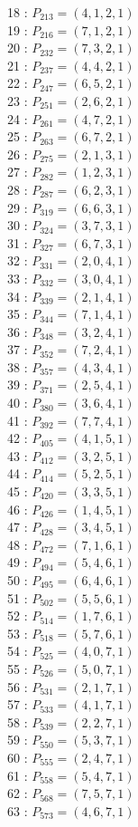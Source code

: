 \documentclass{article}
\begin{document}
{\begin{multicols}{2}
18 : $P_{213}=( 4, 1, 2, 1 )$\\
19 : $P_{216}=( 7, 1, 2, 1 )$\\
20 : $P_{232}=( 7, 3, 2, 1 )$\\
21 : $P_{237}=( 4, 4, 2, 1 )$\\
22 : $P_{247}=( 6, 5, 2, 1 )$\\
23 : $P_{251}=( 2, 6, 2, 1 )$\\
24 : $P_{261}=( 4, 7, 2, 1 )$\\
25 : $P_{263}=( 6, 7, 2, 1 )$\\
26 : $P_{275}=( 2, 1, 3, 1 )$\\
27 : $P_{282}=( 1, 2, 3, 1 )$\\
28 : $P_{287}=( 6, 2, 3, 1 )$\\
29 : $P_{319}=( 6, 6, 3, 1 )$\\
30 : $P_{324}=( 3, 7, 3, 1 )$\\
31 : $P_{327}=( 6, 7, 3, 1 )$\\
32 : $P_{331}=( 2, 0, 4, 1 )$\\
33 : $P_{332}=( 3, 0, 4, 1 )$\\
34 : $P_{339}=( 2, 1, 4, 1 )$\\
35 : $P_{344}=( 7, 1, 4, 1 )$\\
36 : $P_{348}=( 3, 2, 4, 1 )$\\
37 : $P_{352}=( 7, 2, 4, 1 )$\\
38 : $P_{357}=( 4, 3, 4, 1 )$\\
39 : $P_{371}=( 2, 5, 4, 1 )$\\
40 : $P_{380}=( 3, 6, 4, 1 )$\\
41 : $P_{392}=( 7, 7, 4, 1 )$\\
42 : $P_{405}=( 4, 1, 5, 1 )$\\
43 : $P_{412}=( 3, 2, 5, 1 )$\\
44 : $P_{414}=( 5, 2, 5, 1 )$\\
45 : $P_{420}=( 3, 3, 5, 1 )$\\
46 : $P_{426}=( 1, 4, 5, 1 )$\\
47 : $P_{428}=( 3, 4, 5, 1 )$\\
48 : $P_{472}=( 7, 1, 6, 1 )$\\
49 : $P_{494}=( 5, 4, 6, 1 )$\\
50 : $P_{495}=( 6, 4, 6, 1 )$\\
51 : $P_{502}=( 5, 5, 6, 1 )$\\
52 : $P_{514}=( 1, 7, 6, 1 )$\\
53 : $P_{518}=( 5, 7, 6, 1 )$\\
54 : $P_{525}=( 4, 0, 7, 1 )$\\
55 : $P_{526}=( 5, 0, 7, 1 )$\\
56 : $P_{531}=( 2, 1, 7, 1 )$\\
57 : $P_{533}=( 4, 1, 7, 1 )$\\
58 : $P_{539}=( 2, 2, 7, 1 )$\\
59 : $P_{550}=( 5, 3, 7, 1 )$\\
60 : $P_{555}=( 2, 4, 7, 1 )$\\
61 : $P_{558}=( 5, 4, 7, 1 )$\\
62 : $P_{568}=( 7, 5, 7, 1 )$\\
63 : $P_{573}=( 4, 6, 7, 1 )$\\
\end{multicols}
}
\end{document}
